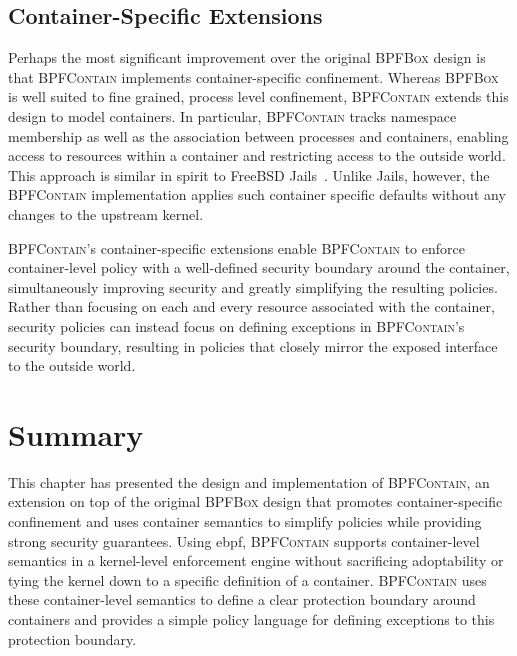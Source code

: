 \documentclass[
  fontsize=12pt,
  titlepage=firstiscover,
  paper=letter,
oneside,
  cleardoublepage=plain,
  parskip=half-,
  DIV=10,
  parindent,
  appendixprefix,
  chapterprefix,
  listof=totoc,
]{scrbook}
\newcommand{\bpfbox}{\textsc{BPFBox}}
\newcommand{\bpfcontain}{\textsc{BPFContain}}
\begin{document}
\subsection{Container-Specific Extensions}\label{ss:bpfcontain-extending}

Perhaps the most significant improvement over the original \bpfbox{} design is that
\bpfcontain{} implements container-specific confinement. Whereas \bpfbox{} is well suited
to fine grained, process level confinement, \bpfcontain{} extends this design to model
containers. In particular, \bpfcontain{} tracks namespace membership as well as the
association between processes and containers, enabling access to resources within
a container and restricting access to the outside world. This approach is similar in
spirit to FreeBSD Jails~\cite{kamp2000_jails}. Unlike Jails, however, the \bpfcontain{}
implementation applies such container specific defaults without any changes to the
upstream kernel.

\bpfcontain{}'s container-specific extensions enable \bpfcontain{} to enforce
container-level policy with a well-defined security boundary around the container,
simultaneously improving security and greatly simplifying the resulting policies. Rather
than focusing on each and every resource associated with the container, security policies
can instead focus on defining exceptions in \bpfcontain{}'s security boundary, resulting
in policies that closely mirror the exposed interface to the outside world.






\section{Summary}\label{s:bpfcontain-summary}

This chapter has presented the design and implementation of \bpfcontain{}, an extension on
top of the original \bpfbox{} design that promotes container-specific confinement and uses
container semantics to simplify policies while providing strong security guarantees.
Using \gls{ebpf}, \bpfcontain{} supports container-level semantics in a kernel-level
enforcement engine without sacrificing adoptability or tying the kernel down to a specific
definition of a container. \bpfcontain{} uses these container-level semantics to define
a clear protection boundary around containers and provides a simple policy language for
defining exceptions to this protection boundary.
 
\end{document}
